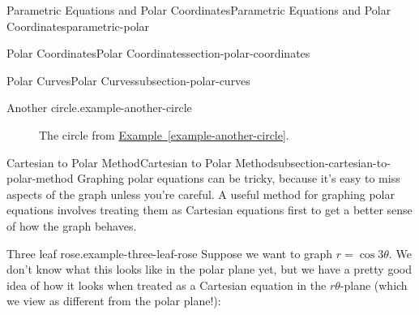 \documentclass[oneside,10pt,]{book}
\numberwithin{equation}{section}
\begin{document}
\begin{chapterptx}{Parametric Equations and Polar Coordinates}{}{Parametric Equations and Polar Coordinates}{}{}{parametric-polar}
\begin{sectionptx}{Polar Coordinates}{}{Polar Coordinates}{}{}{section-polar-coordinates}
\begin{subsectionptx}{Polar Curves}{}{Polar Curves}{}{}{subsection-polar-curves}
\begin{example}{Another circle.}{example-another-circle}
\end{example}
\begin{figure}
\centering
{
}
\caption{The circle from \hyperref[example-another-circle]{Example~\ref{example-another-circle}}.\label{figure-cosine-polar-circle}}
\end{figure}
\end{subsectionptx}
%
%
\typeout{************************************************}
\typeout{************************************************}
%
\begin{subsectionptx}{Cartesian to Polar Method}{}{Cartesian to Polar Method}{}{}{subsection-cartesian-to-polar-method}
\hypertarget{p-1032}{}%
Graphing polar equations can be tricky, because it's easy to miss aspects of the graph unless you're careful. A useful method for graphing polar equations involves treating them as Cartesian equations first to get a better sense of how the graph behaves.%
\begin{example}{Three leaf rose.}{example-three-leaf-rose}%
\hypertarget{p-1033}{}%
Suppose we want to graph \(r = \cos3\theta\). We don't know what this looks like in the polar plane yet, but we have a pretty good idea of how it looks when treated as a Cartesian equation in the \(r\theta\)-plane (which we view as different from the polar plane!):%
\begin{figure}
\centering
{
}
\end{figure}
\end{example}
\end{subsectionptx}
\end{sectionptx}
\end{chapterptx}
\end{document}
